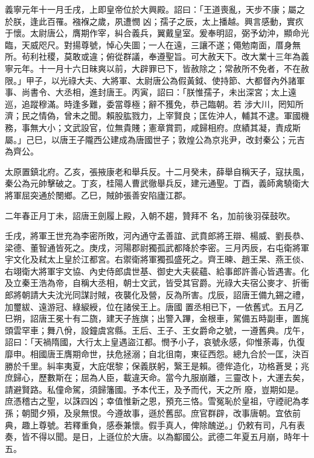 \begin{pinyinscope}
 義寧元年十一月壬戌，上即皇帝位於大興殿。詔曰：「王道喪亂，天步不康；屬之於朕，逢此百罹。襁褓之歲，夙遭憫
 凶；孺子之辰，太上播越。興言感動，實疚于懷。太尉唐公，膺期作宰，糾合義兵，翼戴皇室。爰奉明詔，弼予幼沖，顯命光臨，天威咫尺。對揚尊號，悼心失圖；一人在遠，三讓不遂；僶勉南面，厝身無所。茍利社稷，莫敢或違；俯從群議，奉遵聖旨。可大赦天下。改大業十三年為義寧元年。十一月十六日昧爽以前，大辟罪已下，皆赦除之；常赦所不免者，不在赦限。」甲子，以光祿大夫、大將軍、太尉唐公為假黃鉞、使持節、大都督內外諸軍事、尚書令、大丞相，進封唐王。丙寅，詔曰：「朕惟孺子，未出深宮；太上遠巡，追蹤穆滿。時逢多難，委當尊極；辭不獲免，恭己臨朝。若
 涉大川，罔知所濟；民之情偽，曾未之聞。賴股肱戮力，上宰賢良；匡佐沖人，輔其不逮。軍國機務，事無大小；文武設官，位無貴賤；憲章賞罰，咸歸相府。庶績其凝，責成斯屬。」己巳，以唐王子隴西公建成為唐國世子；敦煌公為京兆尹，改封秦公；元吉為齊公。



 太原置鎮北府。乙亥，張掖康老和舉兵反。十二月癸未，薛舉自稱天子，寇扶風，秦公為元帥擊破之。丁亥，桂陽人曹武徹舉兵反，建元通聖。丁酉，義師禽驍衛大將軍屈突通於閿鄉。乙巳，賊帥張善安陷廬江郡。



 二年春正月丁未，詔唐王劍履上殿，入朝不趨，贊拜不
 名，加前後羽葆鼓吹。



 壬戌，將軍王世充為李密所敗，河內通守孟善誼、武賁郎將王辯、楊威、劉長恭、梁德、董智通皆死之。庚戌，河陽郡尉獨孤武都降於李密。三月丙辰，右屯衛將軍宇文化及弒太上皇於江都宮。右禦衛將軍獨孤盛死之。齊王暕、趙王杲、燕王倓、右翊衛大將軍宇文協、內史侍郎虞世基、御史大夫裴蘊、給事郎許善心皆遇害。化及立秦王浩為帝，自稱大丞相，朝士文武，皆受其官爵。光祿大夫宿公麥才、折衝郎將朝請大夫沈光同謀討賊，夜襲化及營，反為所害。戊辰，詔唐王備九錫之禮，加璽紱、遠游冠、綠綟綬，位在諸侯王上。唐國
 置丞相已下，一依舊式。五月乙巳朔，詔唐王冕十有二旒，建天子旌旗；出警入蹕，金根車，駕備五時副車，置旄頭雲罕車；舞八佾，設鐘虞宮縣。王后、王子、王女爵命之號，一遵舊典。戊午，詔曰：「天禍隋國，大行太上皇遇盜江都。憫予小子，哀號永感，仰惟荼毒，仇復靡申。相國唐王膺期命世，扶危拯溺；自北徂南，東征西怨。總九合於一匡，決百勝於千里。糾率夷夏，大庇氓黎；保義朕躬，繄王是賴。德侔造化，功格蒼旻；兆庶歸心，歷數斯在；屈為人臣，載違天命。當今九服崩離，三靈改卜，大運去矣，請避賢路。私僮命駕，須歸籓國。予本代王，及予而代，天之所
 廢，豈期如是。庶憑稽古之聖，以誅四凶；幸值惟新之恩，預充三恪。雪冤恥於皇祖，守禋祀為孝孫；朝聞夕殞，及泉無恨。今遵故事，遜於舊邸。庶官群辟，改事唐朝。宜依前典，趣上尊號。若釋重負，感泰兼懷。假手真人，俾除醜逆。」仍敕有司，凡有表奏，皆不得以聞。是日，上遜位於大唐。以為酅國公。武德二年夏五月崩，時年十五。




\end{pinyinscope}

